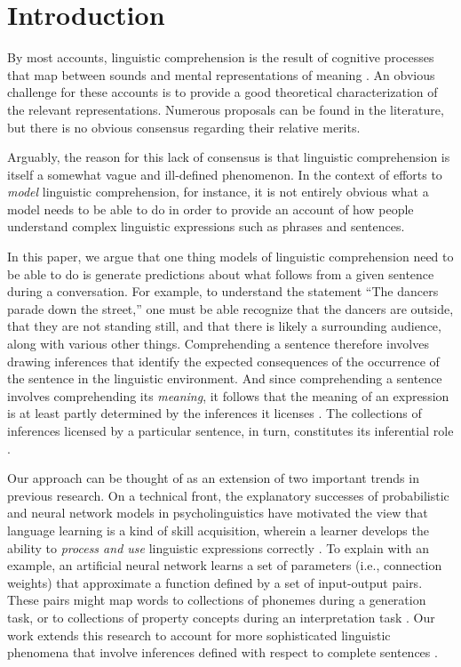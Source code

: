 \documentclass[utf8]{frontiersSCNS} %
\begin{document}
\section{Introduction}

By most accounts, linguistic comprehension is the result of cognitive processes that map between sounds and mental representations of meaning \citep[e.g.,][]{Christiansen:2015,Pickering:2013,SmolenskyLegendre:2006}. An obvious challenge for these accounts is to provide a good theoretical characterization of the relevant representations. Numerous proposals can be found in the literature, but there is no obvious consensus regarding their relative merits. 

Arguably, the reason for this lack of consensus is that linguistic comprehension is itself a somewhat vague and ill-defined phenomenon. In the context of efforts to \textit{model} linguistic comprehension, for instance, it is not entirely obvious what a model needs to be able to do in order to provide an account of how people understand complex linguistic expressions such as phrases and sentences. 

In this paper, we argue that one thing models of linguistic comprehension need to be able to do is generate predictions about what follows from a given sentence during a conversation. For example, to understand the statement ``The dancers parade down the street,'' one must be able recognize that the dancers are outside, that they are not standing still, and that there is likely a surrounding audience, along with various other things. Comprehending a sentence therefore involves drawing inferences that identify the expected consequences of the occurrence of the sentence in the linguistic environment. And since comprehending a sentence involves comprehending its \textit{meaning}, it follows that the meaning of an expression is at least partly determined by the inferences it licenses \citep{Brandom:1994,Brandom:2000,Sellars:1953}. The collections of inferences licensed by a particular sentence, in turn, constitutes its inferential role \citep{Brandom:1994}.

Our approach can be thought of as an extension of two important trends in previous research. On a technical front, the explanatory successes of probabilistic and neural network models in psycholinguistics have motivated the view that language learning is a kind of skill acquisition, wherein a learner develops the ability to \textit{process and use} linguistic expressions correctly \citep{Christiansen:2015,Seidenberg:1997,Elman:1990,Elman:1991,ChaterManning:2006,Tomasello:2003}. To explain with an example, an artificial neural network learns a set of parameters (i.e., connection weights) that approximate a function defined by a set of input-output pairs. These pairs might map words to collections of phonemes during a generation task, or to collections of property concepts during an interpretation task \citep[see, e.g.,][]{McClelland:2010}. Our work extends this research to account for more sophisticated linguistic phenomena that involve inferences defined with respect to complete sentences \citep[cf.][]{StJohn:1990,Rabovsky:2017}. 
\end{document}
